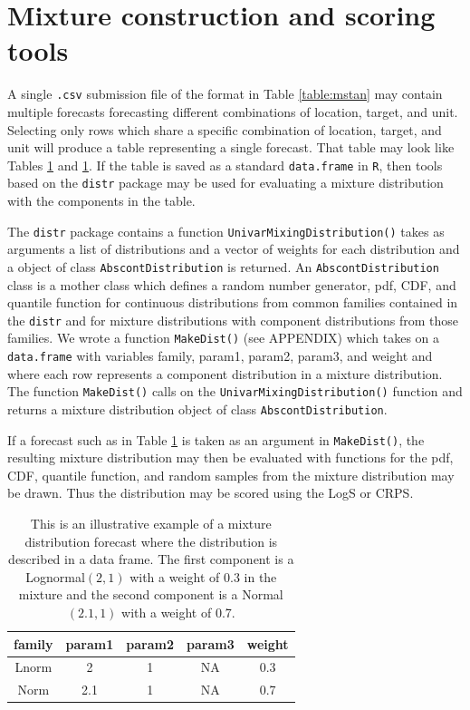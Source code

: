 \documentclass[11pt,notitlepage]{isuthesis}
\begin{document}
\section{Mixture construction and scoring tools}
\label{section:tools}

A single \texttt{.csv} submission file of the format in Table \ref{table:mstan} 
may contain multiple forecasts forecasting different combinations of location,
target, and unit. Selecting only rows which share a specific combination of 
location, target, and unit will produce a table representing a single forecast.
That table may look like Tables \ref{tab:preddf1} and 
\ref{tab:preddf1}. If the table is saved as a standard \texttt{data.frame} in 
\texttt{R}, then tools based on the \texttt{distr} package 
\cite[]{camphausen2007distr} may be used for evaluating a mixture distribution 
with the components in the table. 


The \texttt{distr} package contains a function 
\texttt{UnivarMixingDistribution()} takes as arguments a list of distributions
and a vector of weights for each distribution and a object of class 
\texttt{AbscontDistribution} is returned. An \texttt{AbscontDistribution} class
is a mother class which defines a random number generator, pdf,
CDF, and quantile function for continuous distributions from common
families contained in the \texttt{distr} and for mixture distributions with 
component distributions from those families.
We wrote a function \texttt{MakeDist()} (see APPENDIX)
which takes on a \texttt{data.frame} with variables
family, param1, param2, param3, and weight and where each row represents a
component distribution in a mixture distribution. The function 
\texttt{MakeDist()} calls on the \texttt{UnivarMixingDistribution()} function
and returns a mixture distribution object of class \texttt{AbscontDistribution}.

If a forecast such as in Table \ref{tab:preddf1} is taken as an argument in 
\texttt{MakeDist()}, the resulting mixture distribution may then be evaluated 
with functions for the pdf, CDF, quantile function, and random samples from the
mixture distribution may be drawn. Thus the distribution may be scored using the
LogS or CRPS.



\begin{table}[h!]
\centering
 \begin{tabular}{|c|c|c|c|c|}
 \hline
    family & param1 & param2 & param3 & weight
    \\ \hline
    Lnorm & 2 & 1 & NA & 0.3  \\
    Norm & 2.1 & 1 & NA & 0.7 \\
 \hline
 \end{tabular}
  \begin{minipage}{11cm}
\captionsetup{font=scriptsize}
 \caption[Illustrative forecast 1]{This is an illustrative example of a
 mixture distribution
 forecast where the distribution is described in a data frame. The first 
 component is a Lognormal$(2,1)$ with a weight of 0.3 in the mixture and the 
 second component is a Normal$(2.1,1)$ with a weight of 0.7.}
 \label{tab:preddf1}
 \end{minipage}
\end{table}
\end{document}
